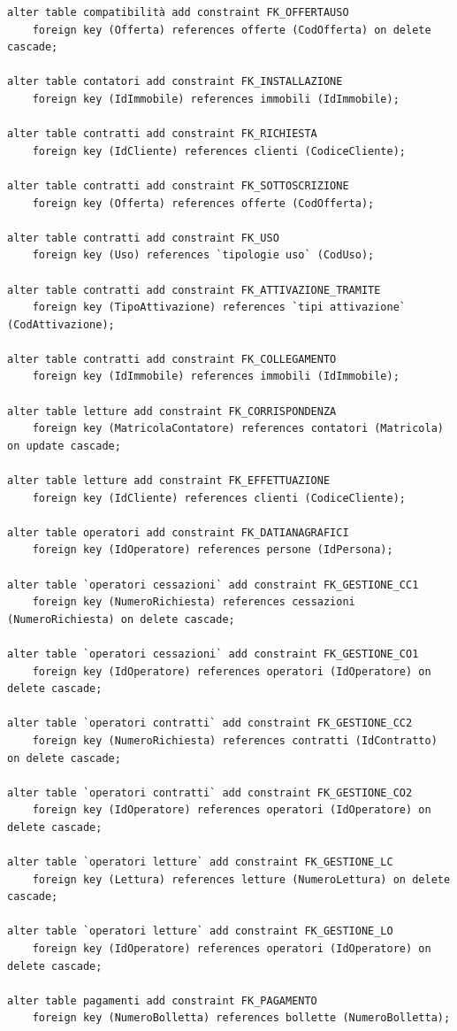 \documentclass[a4paper,12pt]{report}
\begin{document}
\begin{lstlisting}
alter table compatibilità add constraint FK_OFFERTAUSO
    foreign key (Offerta) references offerte (CodOfferta) on delete cascade;

alter table contatori add constraint FK_INSTALLAZIONE
    foreign key (IdImmobile) references immobili (IdImmobile);
     
alter table contratti add constraint FK_RICHIESTA
    foreign key (IdCliente) references clienti (CodiceCliente);

alter table contratti add constraint FK_SOTTOSCRIZIONE
    foreign key (Offerta) references offerte (CodOfferta);

alter table contratti add constraint FK_USO
    foreign key (Uso) references `tipologie uso` (CodUso);

alter table contratti add constraint FK_ATTIVAZIONE_TRAMITE
    foreign key (TipoAttivazione) references `tipi attivazione` (CodAttivazione);

alter table contratti add constraint FK_COLLEGAMENTO
    foreign key (IdImmobile) references immobili (IdImmobile);

alter table letture add constraint FK_CORRISPONDENZA
    foreign key (MatricolaContatore) references contatori (Matricola) on update cascade;
     
alter table letture add constraint FK_EFFETTUAZIONE
    foreign key (IdCliente) references clienti (CodiceCliente);
     
alter table operatori add constraint FK_DATIANAGRAFICI
    foreign key (IdOperatore) references persone (IdPersona);
    
alter table `operatori cessazioni` add constraint FK_GESTIONE_CC1
    foreign key (NumeroRichiesta) references cessazioni (NumeroRichiesta) on delete cascade;
    
alter table `operatori cessazioni` add constraint FK_GESTIONE_CO1
    foreign key (IdOperatore) references operatori (IdOperatore) on delete cascade;

alter table `operatori contratti` add constraint FK_GESTIONE_CC2
    foreign key (NumeroRichiesta) references contratti (IdContratto) on delete cascade;
    
alter table `operatori contratti` add constraint FK_GESTIONE_CO2
    foreign key (IdOperatore) references operatori (IdOperatore) on delete cascade;

alter table `operatori letture` add constraint FK_GESTIONE_LC
    foreign key (Lettura) references letture (NumeroLettura) on delete cascade;
    
alter table `operatori letture` add constraint FK_GESTIONE_LO
    foreign key (IdOperatore) references operatori (IdOperatore) on delete cascade;

alter table pagamenti add constraint FK_PAGAMENTO
    foreign key (NumeroBolletta) references bollette (NumeroBolletta);
\end{lstlisting}
\end{document}
